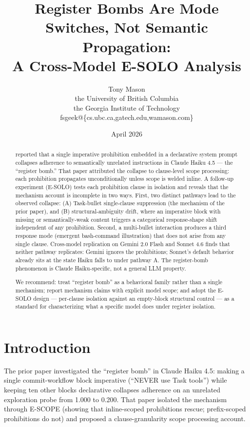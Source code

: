 \documentclass[11pt,a4paper]{article}
\title{\textbf{Register Bombs Are Mode Switches, Not Semantic Propagation: \\
A Cross-Model E-SOLO Analysis}}
\author{Tony Mason \\
the University of British Columbia \\
the Georgia Institute of Technology \\
fsgeek@\{cs.ubc.ca,gatech.edu,wamason.com\}}
\date{April 2026}
\begin{document}
\maketitle

\begin{abstract}
\citet{mason2026registerbombs} reported that a single imperative prohibition
embedded in a declarative system prompt collapses adherence to
semantically unrelated instructions in Claude Haiku 4.5 --- the
``register bomb.'' That paper attributed the collapse to clause-level
scope processing: each prohibition propagates unconditionally unless
scope is welded inline. A follow-up experiment (E-SOLO) tests each
prohibition clause in isolation and reveals that the mechanism
account is incomplete in two ways. First, two distinct pathways lead
to the observed collapse: (A) Task-bullet single-clause suppression
(the mechanism of the prior paper), and (B) structural-ambiguity
drift, where an imperative block with missing or semantically-weak
content triggers a categorical response-shape shift independent of
any prohibition. Second, a multi-bullet interaction produces a third
response mode (emergent bash-command illustration) that does not
arise from any single clause. Cross-model replication on Gemini 2.0
Flash and Sonnet 4.6 finds that neither pathway replicates: Gemini
ignores the prohibitions; Sonnet's default behavior already sits at
the state Haiku falls to under pathway A. The register-bomb
phenomenon is Claude Haiku-specific, not a general LLM property.

We recommend: treat ``register bomb'' as a behavioral family rather
than a single mechanism; report mechanism claims with explicit
model scope; and adopt the E-SOLO design --- per-clause isolation
against an empty-block structural control --- as a standard for
characterizing what a specific model does under register isolation.
\end{abstract}

\section{Introduction}

The prior paper \citep{mason2026registerbombs} investigated the
``register bomb'' in Claude Haiku 4.5: making a single commit-workflow
block imperative (``NEVER use Task tools'') while keeping ten other
blocks declarative collapses adherence on an unrelated exploration
probe from 1.000 to 0.200. That paper isolated the mechanism through
E-SCOPE (showing that inline-scoped prohibitions rescue; prefix-scoped
prohibitions do not) and proposed a clause-granularity scope processing
account.
\end{document}
